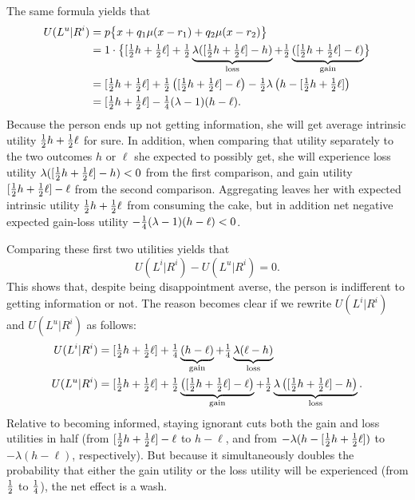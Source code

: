 The same formula yields that
\begin{align*}
  U(L^u|R^i)
&= p\bigl\{x + q_1\mu(x - r_1) + q_2\mu(x - r_2)\bigr\}
\\
&= 1\cdot\bigl\{[\tfrac{1}{2} h + \tfrac{1}{2} \ell] + \tfrac{1}{2}\underbrace{\lambda([\tfrac{1}{2} h + \tfrac{1}{2} \ell] - h)}_{\text{loss}} + \tfrac{1}{2}\underbrace{([\tfrac{1}{2} h + \tfrac{1}{2} \ell] - \ell)}_{\text{gain}}\bigr\}\\
&= [\tfrac{1}{2} h + \tfrac{1}{2} \ell] +
   \tfrac{1}{2}\left([\tfrac{1}{2} h + \tfrac{1}{2} \ell] - \ell\right)
   -\tfrac{1}{2}\lambda\left(h - [\tfrac{1}{2} h + \tfrac{1}{2} \ell]\right)\\
&= [\tfrac{1}{2} h + \tfrac{1}{2} \ell] - \tfrac{1}{4}(\lambda-1)(h - \ell).
\end{align*}
Because the person ends up not getting information, she will get
average intrinsic utility $\tfrac{1}{2} h + \tfrac{1}{2} \ell$ for sure. In addition, when comparing that utility separately to the two outcomes $h$ or $\ell$ she expected to possibly get, she will experience loss utility $\lambda([\tfrac{1}{2} h + \tfrac{1}{2} \ell] - h) < 0$ from the first comparison, and gain utility $[\tfrac{1}{2} h + \tfrac{1}{2}\ell] - \ell$ from the second comparison. Aggregating leaves her with expected intrinsic utility $\tfrac{1}{2} h + \tfrac{1}{2} \ell$ from consuming the cake, but in addition net negative expected gain-loss utility $-\tfrac{1}{4}(\lambda - 1)(h -
\ell) < 0$.

Comparing these first two utilities yields that
\begin{equation*}
  U(L^i|R^i) - U(L^u|R^i) = 0.
\end{equation*}
This shows that, despite being disappointment averse, the person is indifferent
to getting information or not. The reason becomes clear if we rewrite $U(L^i|R^i)$ and $U(L^u|R^i)$ as follows:
\begin{align*}
  U(L^i|R^i) &= [\tfrac{1}{2} h + \tfrac{1}{2} \ell] +
  \tfrac{1}{4} \underbrace{(h-\ell)}_{\text{gain}} +
  \tfrac{1}{4} \underbrace{\lambda(\ell-h)}_{\text{loss}}\\
  U(L^u|R^i) &= [\tfrac{1}{2} h + \tfrac{1}{2} \ell] +
  \tfrac{1}{2}\underbrace{\left([\tfrac{1}{2} h + \tfrac{1}{2} \ell] - \ell\right)}_{\text{gain}} +
  \tfrac{1}{2}\underbrace{\lambda\left([\tfrac{1}{2} h + \tfrac{1}{2} \ell]-h\right)}_{\text{loss}}.
\end{align*}
Relative to becoming informed, staying ignorant cuts both the gain and loss
utilities in half (from $[\tfrac{1}{2} h + \tfrac{1}{2} \ell] - \ell$ to $h - \ell$, and
from $-\lambda(h - [\tfrac{1}{2} h + \tfrac{1}{2} \ell])$ to $-\lambda(h - \ell)$,
respectively). But because it simultaneously doubles the probability that
either the gain utility or the loss utility will be experienced (from $\tfrac{1}{2}$
to $\tfrac{1}{4}$), the net effect is a wash.

